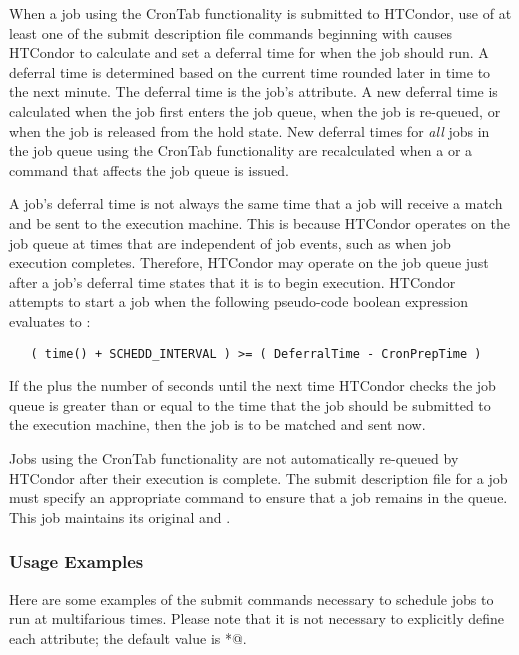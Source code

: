 When a job using the CronTab functionality is submitted to HTCondor, 
use of at least one of the submit description file commands
beginning with  causes HTCondor
to calculate and set a deferral time for when the job should run. 
A deferral time is determined based on the current time 
rounded later in time to the next minute. 
The deferral time is the job's  attribute. 
A new deferral time is calculated when the job 
first enters the job queue, when 
the job is re-queued, or when the job is released from the hold state. 
New deferral times for \emph{all} jobs in the job queue 
using the CronTab functionality are recalculated 
when a  or a  command that
affects the job queue is issued.

A job's deferral time is not always the same time that a job 
will receive a match and be sent to the execution machine. 
This is because HTCondor operates on the job queue
at times that are independent of job events,
such as when job execution completes.
Therefore,
HTCondor may operate on the job queue just after 
a job's deferral time states that it is to begin execution. 
HTCondor attempts to start a job when the 
following pseudo-code boolean expression evaluates to :

\footnotesize
\begin{verbatim}
   ( time() + SCHEDD_INTERVAL ) >= ( DeferralTime - CronPrepTime )
\end{verbatim}
\normalsize

If the  plus the number of seconds 
until the next time HTCondor checks 
the job queue is greater than or equal to the time that the job 
should be submitted to the execution machine, 
then the job is to be matched and sent now.

Jobs using the CronTab functionality are not automatically 
re-queued by HTCondor after their execution is complete. 
The submit description file for a job
must specify an appropriate  
command to ensure that a job remains in the queue. 
This job maintains its original  and .

\subsubsection{Usage Examples}
\label{sec:crontab-examples}

Here are some examples of the submit commands
necessary to schedule jobs to run at multifarious times. 
Please note that it is not necessary to 
explicitly define each attribute; the default value is \verb@*@.

